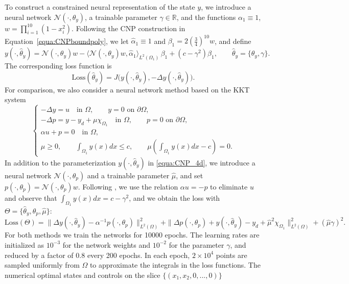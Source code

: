 \documentclass{article}
\numberwithin{equation}{section}
\begin{document}
To construct a constrained neural representation of the state $y$, we introduce a neural network $\mathcal N(\cdot,\theta_y)$, a trainable parameter $\gamma\in\mathbb R$, and the functions $\alpha_1\equiv 1$, $w=\prod_{i=1}^{10}(1- x_i^2)$. Following the CNP construction in Equation~\ref{equa:CNPboundpoly}, we let $\hat{\alpha}_1\equiv 1$ and $\beta_1 = 2(\frac{3}{4})^{10}w$, and define
\begin{equation}
\label{equa:CNP_4d}
y(\cdot,\hat{\theta}_y)
=
\mathcal N(\cdot,\theta_y)w
-
\langle \mathcal N(\cdot,\theta_y)w,\hat\alpha_1\rangle_{L^2(\Omega_1)}\,\beta_1
+
(c-\gamma^2)\beta_1,
\qquad
\hat{\theta}_y=\{\theta_y,\gamma\}.
\end{equation}
The corresponding loss function is
\begin{equation}
\label{equa:4d_loss}
\text{Loss}(\hat{\theta}_y)
=
J\big(y(\cdot,\hat{\theta}_y),-\Delta y(\cdot,\hat{\theta}_y)\big).
\end{equation}
For comparison, we also consider a neural network method based on the KKT system
\begin{equation}
\begin{cases}
-\Delta y = u \quad \text{in }\Omega,
\qquad y=0 \text{ on }\partial\Omega,\\[4pt]
-\Delta p = y-y_d + \mu\chi_{\Omega_1}
\quad \text{in }\Omega,
\qquad p=0 \text{ on }\partial\Omega,\\[4pt]
\alpha u + p = 0 \quad \text{in }\Omega,\\[4pt]
\mu \ge 0,\qquad
\int_{\Omega_1} y(x)dx \le c,\qquad
\mu\!\left(\int_{\Omega_1} y(x)dx-c\right)=0 .
\end{cases}
\end{equation}
In addition to the parameterization $y(\cdot,\hat{\theta}_y)$ in \eqref{equa:CNP_4d}, we introduce a neural network $\mathcal N(\cdot,\theta_p)$ and a trainable parameter $\hat{\mu}$, and set $p(\cdot,\theta_p)=\mathcal N(\cdot,\theta_p)w$. Following \cite{dai2025solving}, we use the relation $\alpha u=-p$ to eliminate $u$ and observe that $\int_{\Omega_1}y(x)dx=c-\gamma^2$, and we obtain the loss with $\Theta=\{\hat{\theta}_y,\theta_p,\hat{\mu}\}$:
\begin{equation}
\text{Loss}(\Theta)
=
\|\Delta y(\cdot,\hat{\theta}_y)-\alpha^{-1}p(\cdot,\theta_p)\|^2_{L^2(\Omega)}
+
\|\Delta p(\cdot,\theta_p)+y(\cdot,\hat{\theta}_y)-y_d+\hat{\mu}^2\chi_{\Omega_1}\|^2_{L^2(\Omega)}
+
(\hat{\mu}\gamma)^2 .
\end{equation}
For both methods we train the networks for 10000 epochs. The learning rates are initialized as $10^{-3}$ for the network weights and $10^{-2}$ for the parameter $\gamma$, and reduced by a factor of $0.8$ every 200 epochs. In each epoch, $2\times10^4$ points are sampled uniformly from $\Omega$ to approximate the integrals in the loss functions. The numerical optimal states and controls on the slice $\{(x_1,x_2,0,...,0)\}$
\end{document}
